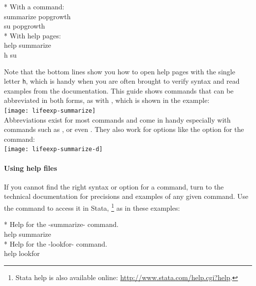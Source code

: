     \begin{docspec}
      * With a command:\\%
      summarize popgrowth\\%
      su popgrowth\\[1em]%
      * With help pages:\\%
      help summarize\\%
      h su%
    \end{docspec}%

  Note that the bottom lines show you how to open help pages with the single letter \texttt{h}, which is handy when you are often brought to verify syntax and read examples from the documentation. This guide shows commands that can be abbreviated in both forms, as with , which is shown in the example:\\[1em]%

    \texttt{[image: lifeexp-summarize]}\\[1em]

  Abbreviations exist for most commands and come in handy especially with commands such as ,  or even . They also work for options like the  option for the  command:\\[1em]%

    \texttt{[image: lifeexp-summarize-d]}\\[1em]
  
    \paragraph{Using help files}%

    If you cannot find the right syntax or option for a command, turn to the technical documentation for precisions and examples of any given command. Use the  command to access it in Stata,%
        \footnote{Stata help is also available online: \url{http://www.stata.com/help.cgi?help}.} %
        as in these examples:%

    \begin{docspec}
      * Help for the -summarize- command.\\
      help summarize\\[1em]
  
      * Help for the -lookfor- command.\\
      help lookfor
    \end{docspec}

